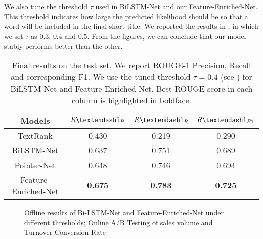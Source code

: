 We also tune the threshold $\tau$ used in BiLSTM-Net and our Feature-Enriched-Net.
This threshold indicates how large the predicted likelihood should be
so that a word will be included in the final short title.
We reported the results in ,
in which we set $\tau$ as $0.3$, $0.4$ and $0.5$.
From the figures, we can conclude that our model stably performs better than
the other.

\begin{table}[htbp]
\centering
\scriptsize
\caption{
	Final results on the test set.
	We report ROUGE-1 Precision, Recall and corresponding F1.
	We use the tuned threshold $\tau=0.4$ (see ) for BiLSTM-Net and Feature-Enriched-Net.
	Best ROUGE score in each column is highlighted in boldface.
}
\label{tab:eval1}
\begin{tabular}{c|ccc}
	\toprule
	Models & $R\textendash1_{P}$ & $R\textendash1_{R}$ & $R\textendash1_{F1}$ \\
	\midrule
	TextRank & 0.430 & 0.219 & 0.290 \\
	BiLSTM-Net & 0.637 & 0.751 & 0.689 \\
	Pointer-Net & 0.648  & 0.746 & 0.694 \\
	Feature-Enriched-Net & \textbf{0.675} & \textbf{0.783} & \textbf{0.725} \\
	\bottomrule
\end{tabular}
\vspace{-10pt}
\end{table}

\begin{figure}[th]
	\centering
	\caption{Offline results of Bi-LSTM-Net and Feature-Enriched-Net under different thresholds;
	Online A/B Testing of sales volume and 
	Turnover Conversion Rate}
	\label{fig:eval}
\end{figure}



